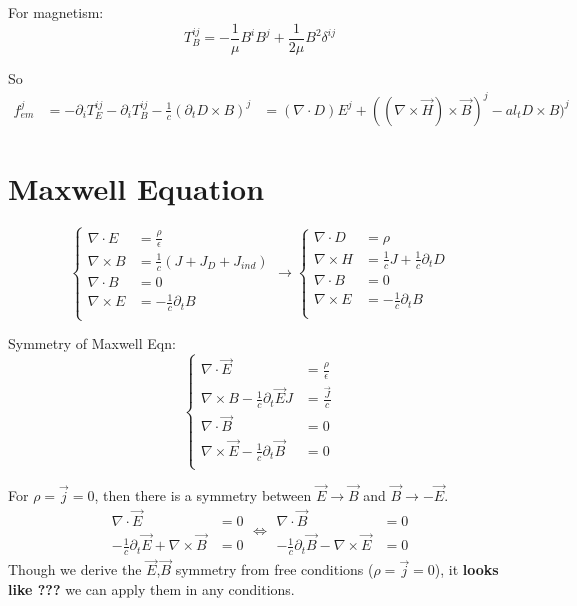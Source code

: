 For magnetism:
\[  T_B^{ij} = -\frac{1}{\mu}B^iB^j + \frac{1}{2\mu}B^2\delta^{ij} \]

So
\[
    \begin{aligned}
	f^j_{em} &= -\partial_iT_E^{ij} - \partial_iT_B^{ij} - \frac{1}{c}(\partial_tD\times B)^j
    &= (\nabla\cdot D)E^j + ((\nabla\times\vec{H})\times\vec{B})^j - al_tD\times B)^j 
    \end{aligned}
\]
\section{Maxwell Equation}
\begin{equation}
    \label{eqn:Maxwell}
    \left\{
    \begin{aligned}
	\nabla\cdot{E} &= \frac{\rho}{\epsilon}	\\
	\nabla\times{B} &= \frac{1}{c}\left(J + J_D + J_{ind}\right)	\\
	\nabla\cdot{B} &= 0  \\
	\nabla\times{E} &= -\frac{1}{c}\partial_{t}B	\\
    \end{aligned}
    \right.
    \longrightarrow
    \left\{
    \begin{aligned}
	\nabla\cdot{D} &= \rho	\\
	\nabla\times{H} &= \frac{1}{c}J +\frac{1}{c}\partial_{t}D    \\
	\nabla\cdot{B} &= 0  \\
	\nabla\times{E} &= -\frac{1}{c}\partial_{t}B	\\
    \end{aligned}
    \right.
\end{equation}

Symmetry of Maxwell Eqn:
\begin{equation}
    \label{eqn:symmetric_Maxwell}
    \left\{
    \begin{aligned}
	\nabla\cdot\vec{E} &= \frac{\rho}{\epsilon}	\\
	\nabla\times{B} - \frac{1}{c}\partial_t\vec{E}J &= \frac{\vec{J}}{c} 	\\
	\nabla\cdot\vec{B} &= 0  \\
	\nabla\times\vec{E} -\frac{1}{c}\partial_{t}\vec{B} &= 0       \\
    \end{aligned}
    \right.
\end{equation}

For $\rho = \vec{j} = 0$, then there is a symmetry between $\vec{E} \rightarrow \vec{B}$ 
and $\vec{B} \rightarrow -\vec{E}$.
\[
    \begin{aligned}
	\nabla\cdot\vec{E} &= 0	\\
	-\frac{1}{c}\partial_t\vec{E} + \nabla\times\vec{B} &= 0
    \end{aligned}
    \Longleftrightarrow
    \begin{aligned}
	\nabla\cdot\vec{B} &= 0	\\
	-\frac{1}{c}\partial_t\vec{B} - \nabla\times\vec{E} &= 0
    \end{aligned}
\]
Though we derive the $\vec{E}$,$\vec{B}$ symmetry from free conditions ($\rho = \vec{j} = 0$),
it \textbf{looks like ???} we can apply them in any conditions.

